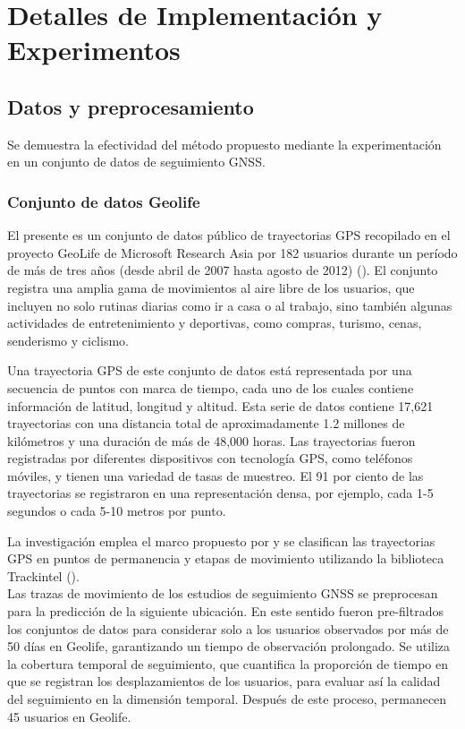 \chapter{Detalles de Implementación y Experimentos}\label{chapter:implementation}
\section{Datos y preprocesamiento}

Se demuestra la efectividad del m\'etodo propuesto mediante la experimentaci\'on en 
un conjunto de datos de seguimiento GNSS.

\subsection{Conjunto de datos Geolife}
El presente es un conjunto de datos p\'ublico de trayectorias GPS recopilado en el 
proyecto GeoLife de Microsoft Research Asia por 182 usuarios durante 
un período de más de tres años (desde abril de 2007 hasta agosto de 2012) (\cite{zheng2011geolife}). 
El conjunto registra una amplia gama de movimientos al aire libre 
de los usuarios, que incluyen no solo rutinas diarias como ir a casa o 
al trabajo, sino también algunas actividades de entretenimiento y deportivas, 
como compras, turismo, cenas, senderismo y ciclismo. 

Una trayectoria GPS de este conjunto de datos está representada por una 
secuencia de puntos con marca de tiempo, cada uno de los cuales contiene 
información de latitud, longitud y altitud. Esta serie de datos 
contiene 17,621 trayectorias con una distancia total de aproximadamente 
1.2 millones de kilómetros y una duración de más de 48,000 horas. 
Las trayectorias fueron registradas por diferentes dispositivos con
tecnolog\'ia GPS, como tel\'efonos m\'oviles, y tienen una variedad de tasas de muestreo. 
El 91 por ciento de las trayectorias se registraron en una representación 
densa, por ejemplo, cada 1-5 segundos o cada 5-10 metros por punto.

La investigación emplea el marco propuesto 
por \cite{Zheng2010GeoLife} y se clasifican las trayectorias GPS en puntos 
de permanencia y etapas de movimiento utilizando la biblioteca 
Trackintel (\cite{martin2023trackintel}).\\

Las trazas de movimiento de los estudios de seguimiento GNSS se 
preprocesan para la predicci\'on de la siguiente ubicaci\'on. 
En este sentido fueron pre-filtrados los conjuntos de datos para considerar solo a los 
usuarios observados por m\'as de 50 d\'ias 
en Geolife, garantizando un tiempo de observaci\'on prolongado. 
Se utiliza la cobertura temporal de seguimiento, que 
cuantifica la proporci\'on de tiempo en que se registran los 
desplazamientos de los usuarios, para evaluar as\'i la calidad del 
seguimiento en la dimensi\'on temporal. Despu\'es de este proceso, 
permanecen 45 usuarios en Geolife.


